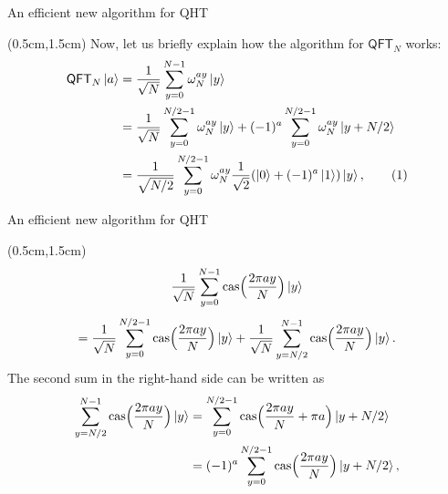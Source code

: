 \documentclass{beamer}
\theoremstyle{definition}
\newcommand\numberthis{\addtocounter{equation}{1}\tag{\theequation}}
\newcommand{\cas}{\mathrm{cas}}
\newcommand{\qft}{\mathsf{QFT}}
\begin{document}
\begin{frame}{An efficient new algorithm for QHT}
    
    \begin{textblock*}{12cm}(0.5cm,1.5cm)
        Now, let us briefly explain how the algorithm for $\qft_N$ works:
        \begin{align*}
            \qft_N\ket{a}
            & = \frac{1}{\sqrt{N}} \sum_{y = 0}^{N - 1} \omega_N^{ay}\ket{y} \\
            & = \frac{1}{\sqrt{N}} \sum_{y = 0}^{N / 2 - 1} \omega_N^{ay} \ket{y} + (-1)^a \sum_{y = 0}^{N / 2 - 1} \omega_N^{ay} \ket{y + N/2} \\
            & = \frac{1}{\sqrt{N / 2}} \sum_{y = 0}^{N / 2 - 1} \omega_N^{ay} \frac{1}{\sqrt{2}} (\ket{0} + (-1)^a \ket{1}) \ket{y}, \numberthis\label{eq:qft_alt}
        \end{align*}
       
    \end{textblock*}
    

\end{frame}




\begin{frame}{An efficient new algorithm for QHT}
    
    \begin{textblock*}{12cm}(0.5cm,1.5cm)
        \begin{equation}
            \frac{1}{\sqrt{N}} \sum_{y = 0}^{N - 1} \cas\Big( \frac{2\pi a y}{N} \Big) \ket{y}  
        \end{equation}
        \begin{equation}
            = \frac{1}{\sqrt{N}} \sum_{y = 0}^{N / 2 - 1} \cas\Big( \frac{2\pi a y}{N} \Big) \ket{y} +  \frac{1}{\sqrt{N}} \sum_{y = N / 2}^{N - 1} \cas\Big( \frac{2\pi a y}{N} \Big) \ket{y}.
        \end{equation}
        The second sum in the right-hand side can be written as 
        \begin{align*}
            \sum_{y = N / 2}^{N - 1} \cas\Big( \frac{2\pi a y}{N} \Big) \ket{y}
            & = \sum_{y = 0}^{N / 2 - 1} \cas\Big( \frac{2\pi a y}{N} + \pi a \Big) \ket{y + N/2} \\
            & = (-1)^a \sum_{y = 0}^{N / 2 - 1} \cas\Big( \frac{2\pi a y}{N} \Big) \ket{y + N/2},
        \end{align*}
    \end{textblock*}

\end{frame}
\end{document}

